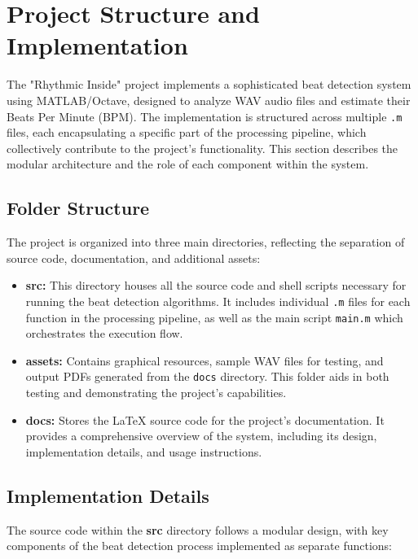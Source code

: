 \section{Project Structure and Implementation}

The "Rhythmic Inside" project implements a sophisticated beat detection system using MATLAB/Octave, designed to analyze WAV audio files and estimate their Beats Per Minute (BPM). The implementation is structured across multiple \texttt{.m} files, each encapsulating a specific part of the processing pipeline, which collectively contribute to the project's functionality. This section describes the modular architecture and the role of each component within the system.

\subsection{Folder Structure}
The project is organized into three main directories, reflecting the separation of source code, documentation, and additional assets:
\begin{itemize}
    \item \textbf{src:} This directory houses all the source code and shell scripts necessary for running the beat detection algorithms. It includes individual \texttt{.m} files for each function in the processing pipeline, as well as the main script \texttt{main.m} which orchestrates the execution flow.
    \item \textbf{assets:} Contains graphical resources, sample WAV files for testing, and output PDFs generated from the \texttt{docs} directory. This folder aids in both testing and demonstrating the project's capabilities.
    \item \textbf{docs:} Stores the LaTeX source code for the project's documentation. It provides a comprehensive overview of the system, including its design, implementation details, and usage instructions.
\end{itemize}

\subsection{Implementation Details}
The source code within the \textbf{src} directory follows a modular design, with key components of the beat detection process implemented as separate functions:

